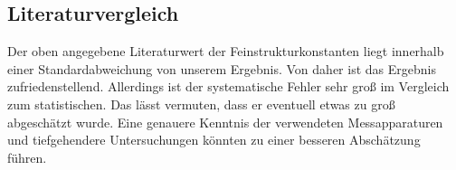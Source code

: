\subsection{Literaturvergleich}
Der oben angegebene Literaturwert der Feinstrukturkonstanten liegt innerhalb einer Standardabweichung von unserem Ergebnis. Von daher ist das Ergebnis zufriedenstellend. Allerdings ist der systematische Fehler sehr groß im Vergleich zum statistischen. Das lässt vermuten, dass er eventuell etwas zu groß abgeschätzt wurde. Eine genauere Kenntnis der verwendeten Messapparaturen und tiefgehendere Untersuchungen könnten zu einer besseren Abschätzung führen.